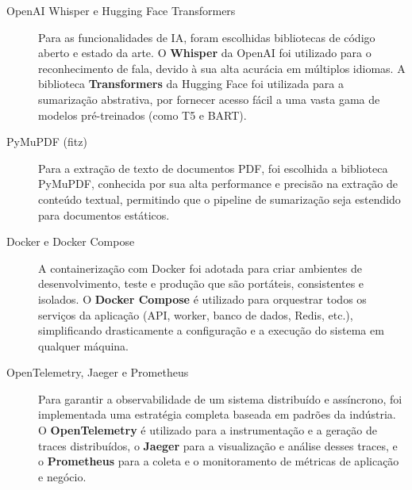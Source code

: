 \begin{description}
    \item[OpenAI Whisper e Hugging Face Transformers] Para as funcionalidades de IA, foram escolhidas bibliotecas de código aberto e estado da arte. O \textbf{Whisper} da OpenAI foi utilizado para o reconhecimento de fala, devido à sua alta acurácia em múltiplos idiomas. A biblioteca \textbf{Transformers} da Hugging Face foi utilizada para a sumarização abstrativa, por fornecer acesso fácil a uma vasta gama de modelos pré-treinados (como T5 e BART).

    \item[PyMuPDF (fitz)] Para a extração de texto de documentos PDF, foi escolhida a biblioteca PyMuPDF, conhecida por sua alta performance e precisão na extração de conteúdo textual, permitindo que o pipeline de sumarização seja estendido para documentos estáticos.

    \item[Docker e Docker Compose] A containerização com Docker foi adotada para criar ambientes de desenvolvimento, teste e produção que são portáteis, consistentes e isolados. O \textbf{Docker Compose} é utilizado para orquestrar todos os serviços da aplicação (API, worker, banco de dados, Redis, etc.), simplificando drasticamente a configuração e a execução do sistema em qualquer máquina.

    \item[OpenTelemetry, Jaeger e Prometheus] Para garantir a observabilidade de um sistema distribuído e assíncrono, foi implementada uma estratégia completa baseada em padrões da indústria. O \textbf{OpenTelemetry} é utilizado para a instrumentação e a geração de traces distribuídos, o \textbf{Jaeger} para a visualização e análise desses traces, e o \textbf{Prometheus} para a coleta e o monitoramento de métricas de aplicação e negócio.

\end{description}
